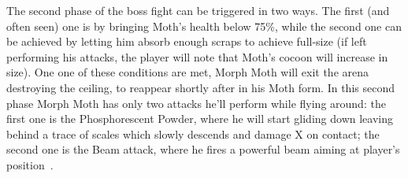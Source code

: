The second phase of the boss fight can be triggered in two ways. The first (and often seen) one is by bringing Moth's health below 75\%, while the second one can be achieved by letting him absorb enough scraps to achieve full-size (if left performing his attacks, the player will note that Moth's cocoon will increase in size). One one of these conditions are met, Morph Moth will exit the arena destroying the ceiling, to reappear shortly after in his Moth form. In this second phase Morph Moth has only two attacks he'll perform while flying around: the first one is the Phosphorescent Powder, where he will start gliding down leaving behind a trace of scales which slowly descends and damage X on contact; the second one is the Beam attack, where he fires a powerful beam aiming at player's position~\cite{book:Compendium}.


